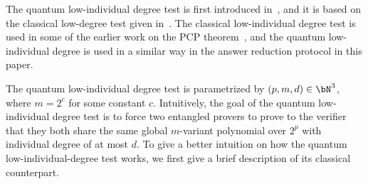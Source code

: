 The quantum low-individual degree test is first introduced in~\cite{jiQuantumSoundnessTesting2022}, and it is based on the classical low-degree test given in~\cite{babaiNondeterministicExponentialTime1991a}. The classical low-individual degree test is used in some of the earlier work on the PCP theorem~\cite{aroraProbabilisticCheckingProofs1998,aroraProofVerificationHardness1998}, and the quantum low-individual degree is used in a similar way in the answer reduction protocol in this paper. 

The quantum low-individual degree test is parametrized by $(p,m,d) \in \bN^3$, where $m = 2^c$ for some constant $c$. Intuitively, the goal of the quantum low-individual degree test is to force two entangled provers to prove to the verifier that they both share the same global $m$-variant polynomial over $2^p$ with individual degree of at most $d$. To give a better intuition on how the quantum low-individual-degree test works, we first give a brief description of its classical counterpart. 
